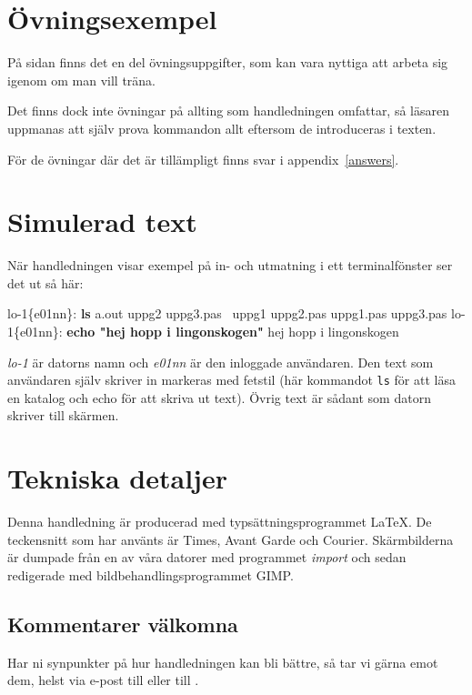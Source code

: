 \documentclass[a4paper,twocolumn]{book}
\begin{document}
\section*{Övningsexempel}

På sidan \pageref{cha:uppgifter} finns det en del övningsuppgifter,
som kan vara nyttiga att arbeta sig igenom om man vill träna.

Det finns dock inte övningar på
allting som handledningen omfattar, så läsaren uppmanas att själv
prova kommandon allt eftersom de introduceras i texten.

För de övningar där det är tillämpligt finns svar i
appendix~\ref{answers}.

\section*{Simulerad text}

När handledningen visar exempel på in- och utmatning i ett
terminalfönster ser det ut så här:
\begin{example}
  lo-1\{e01nn\}: \textbf{ls}
  a.out        uppg2        uppg3.pas~
  uppg1        uppg2.pas
  uppg1.pas    uppg3.pas
  lo-1\{e01nn\}: \textbf{echo "hej hopp i lingonskogen"}
  hej hopp i lingonskogen
\end{example}
\emph{lo-1} är datorns namn och \emph{e01nn} är den inloggade användaren. Den text som användaren själv skriver in markeras med fetstil (här kommandot \texttt{ls} för att läsa en katalog och echo för att skriva ut text). Övrig text är sådant som datorn skriver till skärmen.

\section*{Tekniska detaljer}

Denna handledning är producerad med typsättningsprogrammet \LaTeX. De
teckensnitt som har använts är Times, Avant Garde och Courier.
Skärmbilderna är dumpade från en av våra datorer med programmet
\emph{import} och sedan redigerade med bildbehandlingsprogrammet GIMP.

\subsection*{Kommentarer välkomna}

Har ni synpunkter på hur handledningen kan bli bättre, så tar vi
gärna emot dem, helst via e-post till  eller till
.
\end{document}
